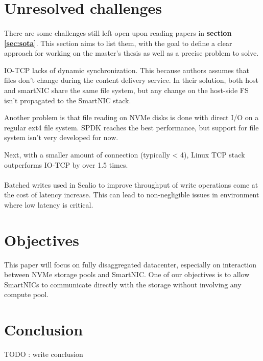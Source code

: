 \documentclass[11pt, a4paper]{article}
\begin{document}
\section{Unresolved challenges}

\paragraph{}
There are some challenges still left open upon reading papers in \textbf{section \ref{sec:sota}}. This section aims to
list them, with the goal to define a clear approach for working on the master's thesis as well as a precise problem to solve.

IO-TCP \cite{kim_rearchitecting_2023} lacks of dynamic synchronization. This because authors assumes that files don't change
during the content delivery service. In their solution, both host and smartNIC share the same file system, but any change
on the host-side FS isn't propagated to the SmartNIC stack.

Another problem is that file reading on NVMe disks is done with direct I/O on a regular ext4 file system. SPDK reaches the best
performance, but support for file system isn't very developed for now.

Next, with a smaller amount of connection (typically < 4), Linux TCP stack outperforms IO-TCP by over 1.5 times.

\paragraph{}
Batched writes used in Scalio \cite{sun_scalio_2025} to improve throughput of write operations come at the cost of latency
increase. This can lead to non-negligible issues in environment where low latency is critical.

\section{Objectives}

This paper will focus on fully disaggregated datacenter, especially on interaction between NVMe storage pools and SmartNIC.
One of our objectives is to allow SmartNICs to communicate directly with the storage without involving any compute pool.

\section{Conclusion}
TODO : write conclusion

\printbibliography
\end{document}
